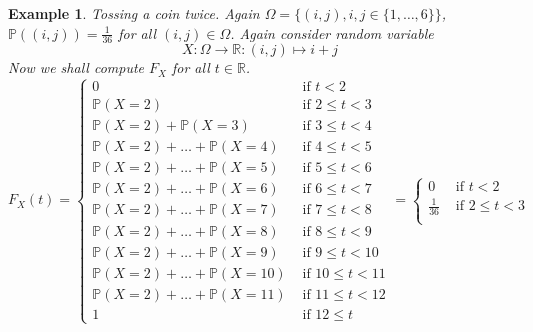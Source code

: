 \documentclass[12pt]{article}
\newtheorem{example}[theorem]{Example}
\begin{document}
\begin{example} Tossing a coin twice. Again
    $\Omega=\{(i,j), i,j\in \{1,\ldots,6\} \}$,
    $\mathbb{P}((i,j))=\frac{1}{36}$ for all
    $(i,j)\in \Omega$. Again consider random variable
    $$
        X:\Omega\to\mathbb{R}:(i,j)\mapsto i+j
    $$
    Now we shall compute $F_X$ for all $t\in\mathbb{R}$.
    $$
        F_X(t)=
        \begin{cases}
            0                                       &
            \mbox { if }t < 2                         \\
            \mathbb{P}(X=2)                         &
            \mbox { if } 2 \leq t < 3                 \\
            \mathbb{P}(X=2)+\mathbb{P}(X=3)         &
            \mbox { if } 3 \leq t < 4                 \\
            \mathbb{P}(X=2)+\ldots+\mathbb{P}(X=4)  & %
            \mbox { if } 4 \leq t < 5                 \\
            \mathbb{P}(X=2)+\ldots+\mathbb{P}(X=5)  & %
            \mbox { if } 5 \leq t < 6                 \\
            \mathbb{P}(X=2)+\ldots+\mathbb{P}(X=6)  & %
            \mbox { if } 6 \leq t < 7                 \\
            \mathbb{P}(X=2)+\ldots+\mathbb{P}(X=7)  & %
            \mbox { if } 7 \leq t < 8                 \\
            \mathbb{P}(X=2)+\ldots+\mathbb{P}(X=8)  & %
            \mbox { if } 8 \leq t < 9                 \\
            \mathbb{P}(X=2)+\ldots+\mathbb{P}(X=9)  & %
            \mbox { if } 9 \leq t < 10                \\
            \mathbb{P}(X=2)+\ldots+\mathbb{P}(X=10) & %
            \mbox { if } 10 \leq t < 11               \\
            \mathbb{P}(X=2)+\ldots+\mathbb{P}(X=11) & %
            \mbox { if } 11 \leq t < 12               \\
            1                                       &
            \mbox { if }12 \leq t
        \end{cases}
        =
        \begin{cases}
            0             & \mbox { if }t < 2           \\
            \frac{1}{36}  & \mbox { if } 2 \leq t < 3   \\

\end{cases}$$
\end{example}
\end{document}
